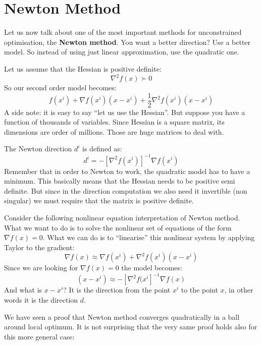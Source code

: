 \section{Newton Method}
\par Let us now talk about one of the most important methods for unconstrained optimisation, the \textbf{Newton method}. You want a better direction? Use a better model. So instead of using just linear approximation, use the quadratic one.
\par Let us assume that the Hessian is positive definite:
\begin{equation}
    \nabla^2 f(x) \succ 0
\end{equation}
So our second order model becomes:
\begin{equation}
    f(x^i) + \nabla f(x^i) (x - x^i) + \frac{1}{2} \nabla^2 f(x^i) (x - x^i)
\end{equation}
A side note: it is easy to say ``let us use the Hessian''. But suppose you have a function of thousands of variables. Since Hessian is a square matrix, its dimensions are order of millions. Those are huge matrices to deal with.
\par The Newton direction $d^i$ is defined as:
\begin{equation}
    d^i = - [\nabla^2 f(x^i)]^{-1} \nabla f(x^i)
\end{equation}
Remember that in order to Newton to work, the quadratic model has to have a minimum. This basically means that the Hessian needs to be positive semi definite. But since in the direction computation we also need it invertible (non singular) we must require that the matrix is positive definite.
\par Consider the following nonlinear equation interpretation of Newton method. What we want to do is to solve the nonlinear set of equations of the form $\nabla f(x) = 0$. What we can do is to ``linearise'' this nonlinear system by applying Taylor to the gradient:
\begin{equation}
    \nabla f(x) \approx \nabla f(x^i) + \nabla^2 f(x^i) (x - x^i)
\end{equation}
Since we are looking for $\nabla f(x) = 0$ the model becomes:
\begin{equation}
    (x - x^i) \approx - [\nabla^2 f(x^i]^{-1} \nabla f(x) 
\end{equation}
And what is $x - x^i$? It is the direction from the point $x^i$ to the point $x$, in other words it is the direction $d$.
\par We have seen a proof that Newton method converges quadratically in a ball around local optimum. It is not surprising that the very same proof holds also for this more general case:
